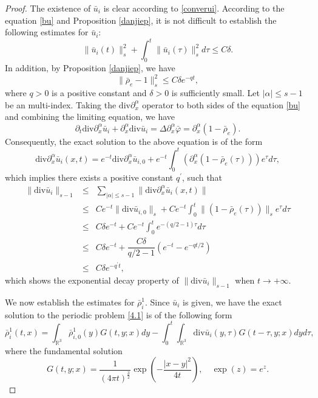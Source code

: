 \documentclass[reqno,twoside,12pt,a4paper]{amsart}
\newcommand{\R}{\mathbb{R}}
\newcommand{\al}{\alpha}
\newcommand{\dive}{\mathrm{div}}
\newcommand{\pt}{\partial_t}
\newcommand{\pa}{\partial}
\newcommand{\vp}{\varphi}
\numberwithin{equation}{section}
\begin{document}
\begin{proof} The existence of $\bar{u}_i$ is clear according to \eqref{converui}. According to the equation \eqref{bu} and Proposition \ref{danjiep}, it is not difficult to establish the following estimates for $\bar{u}_i$:
\[
\|\bar{u}_i(t)\|_s^2+\int_0^t \|\bar{u}_i(\tau)\|_s^2 d\tau \leq C\delta. 
\]
In addition, by Proposition \ref{danjiep}, we have
\[
\|\bar{\rho}_e-1\|_s^2\leq C\delta e^{-q t},
\]
where $q>0$ is a positive constant  and $\delta>0$ is sufficiently small. Let $|\al|\leq s-1$ be an multi-index. Taking the $\dive\pa_x^\al $ operator to both sides of the equation \eqref{bu} and combining the limiting equation, we have
\[
\pt \dive \pa_x^\al\bar{u}_i+\pa_x^\al\dive \bar{u}_i=\Delta \pa_x^\al\bar{\vp}=\pa_x^\al(1-\bar{\rho}_e). 
\]
Consequently, the exact solution to the above equation is of the form
\[
\dive \pa_x^\al\bar{u}_i(x,t)= e^{-t}\dive \pa_x^\al\bar{u}_{i,0}+e^{-t}\int_0^t(\pa_x^\al(1-\bar{\rho}_e(\tau)))e^{\tau}d\tau,
\]
which implies there exists a positive constant $q^\prime$, such that
\begin{eqnarray}
\|\dive \bar{u}_i\|_{s-1}&\leq&\sum_{|\al|\leq s-1}\|\dive \pa_x^\al\bar{u}_i(x,t)\|\nonumber\\
&\leq& Ce^{-t}\|\dive\bar{u}_{i,0}\|_s+Ce^{-t}\int_0^t\|(1-\bar{\rho}_e(\tau))\|_se^\tau d\tau \nonumber\\
&\leq&  C\delta e^{-t}+Ce^{-t}\int_0^t e^{-(q/2-1)\tau}d\tau\nonumber\\
&\leq& C\delta e^{-t}+\dfrac{C\delta }{q/2-1} (e^{-t}-e^{-qt/2})\nonumber\\
&\leq& C\delta e^{-q^\prime t},\nonumber
\end{eqnarray}
which shows the exponential decay property of $\|\dive \bar{u}_i\|_{s-1}$ when $t\to+\infty$. 

We now establish the estimates for $\bar{\rho}_{i}^1$. Since $\bar{u}_i$ is given, we have the exact solution to the periodic problem \eqref{4.1} is of the following form
\[
\bar{\rho}_i^1(t,x)=\int_{\R^3} \bar{\rho}_{i,0}^1(y)G(t,y;x)dy- \int_0^t\int_{\R^3}\dive\bar{u}_i(y,\tau)G(t-\tau,y;x)dyd\tau,
\]
where the fundamental solution
\[
G(t,y;x)=\dfrac{1}{(4\pi t)^{\frac{3}{2}}}\exp\left(-\dfrac{|x-y|^2}{4t}\right),\quad \exp(z)=e^z.
\]


\end{proof}
\end{document}
